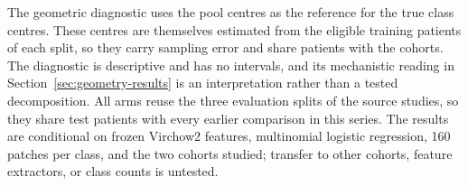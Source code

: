 The geometric diagnostic uses the pool centres as the reference for the true class centres. These centres are themselves estimated from the eligible training patients of each split, so they carry sampling error and share patients with the cohorts. The diagnostic is descriptive and has no intervals, and its mechanistic reading in Section~\ref{sec:geometry-results} is an interpretation rather than a tested decomposition. All arms reuse the three evaluation splits of the source studies, so they share test patients with every earlier comparison in this series. The results are conditional on frozen Virchow2 features, multinomial logistic regression, 160 patches per class, and the two cohorts studied; transfer to other cohorts, feature extractors, or class counts is untested.
